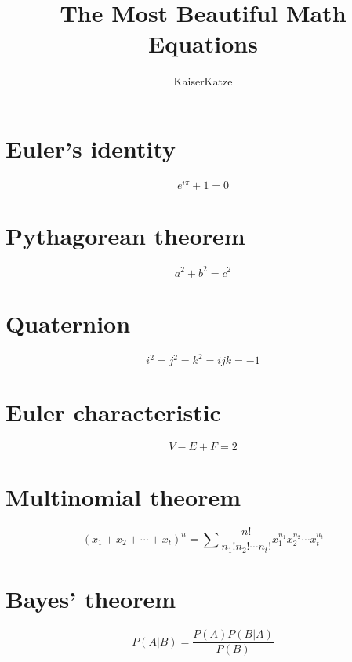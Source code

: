 \documentclass[12pt,twoside]{ctexart}
\title{The Most Beautiful Math Equations}
\author{KaiserKatze}
\begin{document}
\maketitle

\section{Euler's identity}

$$ e^{i \pi} + 1 = 0 $$

\section{Pythagorean theorem}

$$ a^2 + b^2 = c^2 $$

\section{Quaternion}

$$ i^2 = j^2 = k^2 = ijk = -1 $$

\section{Euler characteristic}

$$ V - E + F = 2 $$

\section{Multinomial theorem}

$$ (x_1+x_2+\cdots+x_t)^n=\sum\frac{n!}{n_1!n_2!\cdots n_t!}x_1^{n_1}x_2^{n_2}\cdots x_t^{n_t} $$

\section{Bayes' theorem}

$$ P\left(A|B\right) = \frac{P\left(A\right)P\left(B|A\right)}{P\left(B\right)} $$
\end{document}
